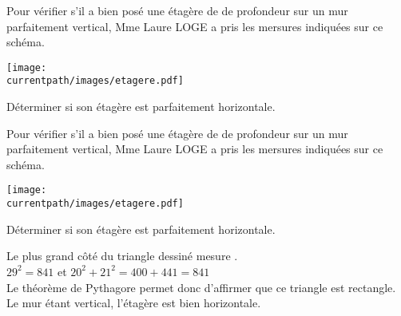 \begin{exercice*}
    Pour vérifier s'il a bien posé une étagère de  de profondeur sur un mur parfaitement vertical, Mme Laure LOGE a pris les mersures indiquées
    sur ce schéma. 

    \begin{minipage}{0.5\linewidth}
        \texttt{[image: \\currentpath/images/etagere.pdf]}
    \end{minipage}
    \begin{minipage}{0.5\linewidth}
        Déterminer si son étagère est parfaitement horizontale.
    \end{minipage}    
\end{exercice*}
\begin{corrige}
    Pour vérifier s'il a bien posé une étagère de  de profondeur sur un mur parfaitement vertical, Mme Laure LOGE a pris les mersures indiquées
    sur ce schéma. 

    \begin{minipage}{0.45\linewidth}
        \texttt{[image: \\currentpath/images/etagere.pdf]}
    \end{minipage}
    \hfill
    \begin{minipage}{0.5\linewidth}
        Déterminer si son étagère est parfaitement horizontale.
    \end{minipage}  

    \medskip
    {\red Le plus grand côté du triangle dessiné mesure .\\
    $29^2=841$ et $20^2+21^2=400+441=841$\\
    Le théorème de Pythagore permet donc d'affirmer que ce triangle est rectangle.\\
    Le mur étant vertical, l'étagère est bien horizontale.}
\end{corrige}

